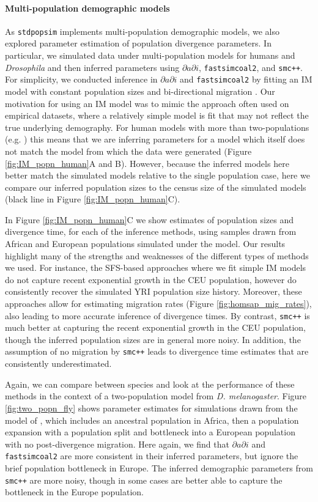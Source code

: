 \documentclass[12pt,halfline,a4paper]{ouparticle}
\newcommand{\dadi}{$\partial a \partial i$\xspace}
\newcommand{\smcpp}{\texttt{smc++}\xspace}
\newcommand{\fastsimcoal}{\texttt{fastsimcoal2}\xspace}
\begin{document}
\paragraph*{Multi-population demographic models}
As \texttt{stdpopsim} implements multi-population demographic models, we also
explored parameter estimation of population divergence parameters. In particular,
we simulated data under multi-population models for humans and \emph{Drosophila}
and then inferred  parameters using \dadi, \fastsimcoal, and \smcpp.
For simplicity, we conducted inference in \dadi and \fastsimcoal by fitting an IM model
with constant population sizes and bi-directional migration \citep{hey2004im}. Our motivation for using
an IM model was to mimic the approach often used on empirical datasets, where a relatively
simple model is fit that may not reflect the true underlying demography.
For human models with more than two-populations (e.g. \cite{gutenkunst2009inferring})
this means that we are inferring parameters for a model which itself does
not match the model from which the data were generated (Figure
\ref{fig:IM_popn_human}A and B). However, because the inferred models here better
match the simulated models relative to the single population case, here we compare
our inferred population sizes to the census size of the simulated models (black line in
Figure \ref{fig:IM_popn_human}C).

In Figure \ref{fig:IM_popn_human}C we show estimates of population sizes and divergence
time, for each of the inference methods, using samples drawn from African and European populations
simulated under the \cite{gutenkunst2009inferring} model. Our results highlight many
of the strengths and weaknesses of the different types of methods we used.
For instance, the SFS-based approaches where we fit simple IM models do not capture
recent exponential growth in the CEU population, however do consistently recover the
simulated YRI population size history. Moreover, these approaches allow for estimating
migration rates (Figure \ref{fig:homsap_mig_rates}), also leading to more accurate inference
of divergence times. By contrast, \smcpp is much better at capturing the recent exponential
growth in the CEU population, though the inferred population sizes are in general more
noisy. In addition, the assumption of no migration by \smcpp leads to divergence time
estimates that are consistently underestimated.

Again, we can compare between species and look at the performance of these methods in
the context of a two-population model from \emph{D. melanogaster}. Figure
\ref{fig:two_popn_fly} shows parameter estimates for simulations drawn from
the model of \cite{li2006inferring}, which includes
an ancestral population in Africa, then a population expansion with a population
split and bottleneck into a European population with no post-divergence migration.
Here again, we find that \dadi and \fastsimcoal are more consistent in their inferred
parameters, but ignore the brief population bottleneck in Europe. The inferred
demographic parameters from \smcpp are more noisy, though in some cases are better
able to capture the bottleneck in the Europe population.
\end{document}
